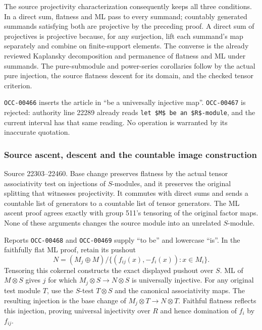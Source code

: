 The source projectivity characterization consequently keeps all three conditions. In a direct sum, flatness and ML pass to every summand; countably generated summands satisfying both are projective by the preceding proof. A direct sum of projectives is projective because, for any surjection, lift each summand's map separately and combine on finite-support elements. The converse is the already reviewed Kaplansky decomposition and permanence of flatness and ML under summands. The pure-submodule and power-series corollaries follow by the actual pure injection, the source flatness descent for its domain, and the checked tensor criterion.

\texttt{OCC-00466} inserts the article in ``be a universally injective map''. \texttt{OCC-00467} is rejected: authority line 22289 already reads \texttt{let\ \$M\$\ be\ an\ \$R\$-module}, and the current interval has that same reading. No operation is warranted by its inaccurate quotation.

\subsubsection{Source ascent, descent and the countable image construction}\label{source-ascent-descent-and-the-countable-image-construction}

Source 22303--22460. Base change preserves flatness by the actual tensor associativity test on injections of \(S\)-modules, and it preserves the original splitting that witnesses projectivity. It commutes with direct sums and sends a countable list of generators to a countable list of tensor generators. The ML ascent proof agrees exactly with group 511's tensoring of the original factor maps. None of these arguments changes the source module into an unrelated \(S\)-module.

Reports \texttt{OCC-00468} and \texttt{OCC-00469} supply ``to be'' and lowercase ``is''. In the faithfully flat ML proof, retain its pushout \[
N=(M_j\oplus M)/\{(f_{ij}(x),-f_i(x)):x\in M_i\}.
\] Tensoring this cokernel constructs the exact displayed pushout over \(S\). ML of \(M\otimes S\) gives \(j\) for which \(M_j\otimes S\to N\otimes S\) is universally injective. For any original test module \(T\), use the \(S\)-test \(T\otimes S\) and the canonical associativity maps. The resulting injection is the base change of \(M_j\otimes T\to N\otimes T\). Faithful flatness reflects this injection, proving universal injectivity over \(R\) and hence domination of \(f_i\) by \(f_{ij}\).


